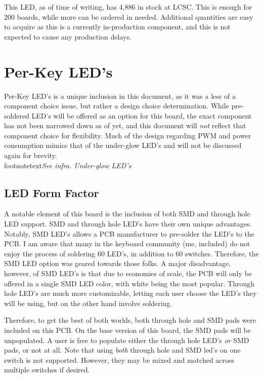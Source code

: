 \documentclass[11pt]{article}
\begin{document}
This LED, as of time of writing, has 4,886 in stock at LCSC. This is enough for 200 boards, while more can be ordered in needed. Additional quantities are easy to acquire as this is a currently in-production component, and this is not expected to cause any production delays. 

\section{Per-Key LED's}

Per-Key LED's is a unique inclusion in this document, as it was a less of a component choice issue, but rather a design choice determination. While pre-soldered LED's will be offered as an option for this board, the exact component has not been narrowed down as of yet, and this document will \emph{not} reflect that component choice for flexibility. Much of the design regarding PWM and power consumption mimics that of the under-glow LED's and will not be discussed again for brevity.\footnotemark \\footnotetext{\emph{See infra. Under-glow LED's}}

\subsection{LED Form Factor}

A notable element of this board is the inclusion of both SMD and through hole LED support. SMD and through hole LED's have their own unique advantages. Notably, SMD LED's allows a PCB manufacturer to pre-solder the LED's to the PCB. I am aware that many in the keyboard community (me, included) do not enjoy the process of soldering 60 LED's, in addition to 60 switches. Therefore, the SMD LED option was geared towards those folks. A major disadvantage, however, of SMD LED's is that due to economies of scale, the PCB will only be offered in a single SMD LED color, with white being the most popular. Through hole LED's are much more customizable, letting each user choose the LED's they will be using, but on the other hand involve soldering. 

Therefore, to get the best of both worlds, both through hole and SMD pads were included on this PCB. On the base version of this board, the SMD pads will be unpopulated. A user is free to populate either the through hole LED's \emph{or} SMD pads, or not at all. Note that using \emph{both} through hole and SMD led's on one switch is not supported. However, they may be mixed and matched across multiple switches if desired.
\end{document}
